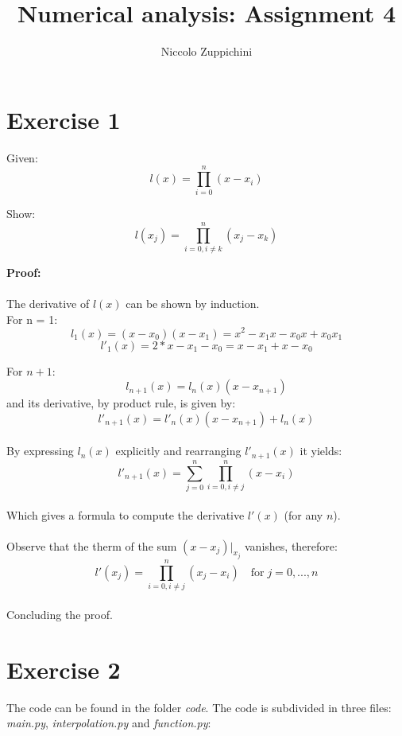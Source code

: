 \documentclass[12pt]{article}
\title{Numerical analysis: Assignment 4}
\author{Niccolo Zuppichini}
\begin{document}
\maketitle
\section*{Exercise 1}

Given: 
$$l(x) = \prod_{i=0}^n (x - x_i) $$

Show: \\
$$l(x_j) = \prod_{i=0, i \neq k}^n (x_j - x_k) $$

\textbf{Proof:} 
\\
\\
The derivative of $l(x)$ can be shown by induction. \\

For n = 1: \\

$$l_1(x) = (x - x_0)(x - x_1) = x^2 -x_1 x -x_0 x + x_0 x_1 $$
$$l'_1(x) = 2*x -x_1 -x_0 = x - x_1 + x - x_0  $$

For $n+1$: \\

$$l_{n+1} (x) = l_n(x) (x - x_{n+1}) $$
and its derivative, by product rule, is given by: \\
$$l'_{n+1} (x) = l'_n(x) (x - x_{n+1}) + l_n(x) $$
\\
By expressing $l_n(x)$ explicitly and rearranging $l'_{n+1} (x)$ it yields: \\
$$l'_{n+1} (x) = \sum_{j=0}^n \prod_{i=0, i\neq j}^n (x - x_i) $$
\\
Which gives a formula to compute the derivative $l'(x)$ (for any $n$). \\
\\
Observe that the therm of the sum $(x - x_j)|_{x_j}$ vanishes, therefore: \\

$$l'(x_j) = \prod_{i=0, i\neq j}^n (x_j - x_i)  \quad \textrm{for} \; j=0,...,n$$
\\
Concluding the proof. \\

\section*{Exercise 2}

The code can be found in the folder \textit{code}. The code is subdivided in three files: \textit{main.py}, \textit{interpolation.py} and \textit{function.py}: \\
\end{document}
